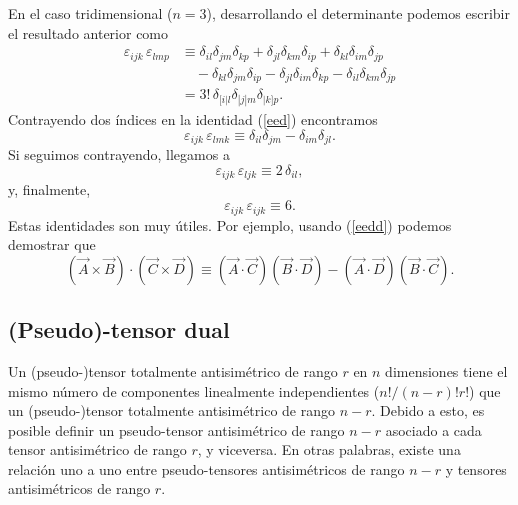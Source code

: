 En el caso tridimensional ($n=3$), desarrollando el determinante podemos escribir el resultado anterior como
\begin{align}
\varepsilon_{ijk}\,\varepsilon_{lmp} & \equiv \delta_{il}\delta_{jm}\delta_{kp} +\delta_{jl}\delta_{km}\delta_{ip} +\delta_{kl}\delta_{im}\delta_{jp} \nonumber\\
& \quad -\delta_{kl}\delta_{jm}\delta_{ip} -\delta_{jl}\delta_{im}\delta_{kp} -\delta_{il}\delta_{km}\delta_{jp} \label{eed}\\
& = 3!\, \delta_{[i|l}\delta_{|j|m}\delta_{|k]p}.
\end{align}
Contrayendo dos índices en la identidad (\ref{eed}) encontramos
\begin{equation}
\boxed{\varepsilon_{ijk}\,\varepsilon_{lmk}\equiv \delta_{il}\delta_{jm} -\delta_{im}\delta_{jl}.} \label{eedd}
\end{equation}
Si seguimos contrayendo, llegamos a
\begin{equation}
\varepsilon_{ijk}\,\varepsilon_{ljk}\equiv 2\,\delta_{il},
\end{equation}
y, finalmente,
\begin{equation}
\varepsilon_{ijk}\,\varepsilon_{ijk}\equiv 6.
\end{equation}
Estas identidades son muy útiles. Por ejemplo, usando (\ref{eedd}) podemos demostrar que
\begin{equation}
(\vec{A}\times\vec{B})\cdot(\vec{C}\times\vec{D})\equiv (\vec{A}\cdot\vec{C})(\vec{B}\cdot\vec{D})-(\vec{A}\cdot\vec{D})(\vec{B}\cdot\vec{C}).
\end{equation}

\subsection{(Pseudo)-tensor dual}

Un (pseudo-)tensor totalmente antisimétrico de rango $r$ en $n$ dimensiones tiene el mismo número de componentes linealmente independientes ($n!/(n-r)!r!$) que un (pseudo-)tensor totalmente antisimétrico de rango $n-r$. Debido a esto, es posible definir un pseudo-tensor antisimétrico de rango $n-r$ asociado a cada tensor antisimétrico de rango $r$, y viceversa. En otras palabras, existe una relación uno a uno entre pseudo-tensores antisimétricos de rango $n-r$ y tensores antisimétricos de rango $r$.

